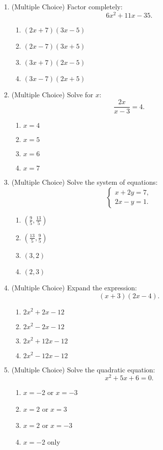 \documentclass[12pt]{article}
\begin{document}
\begin{enumerate}[label=\textbf{Question \arabic*:}]
  \item (Multiple Choice) Factor completely:
    \[
    6x^2 + 11x - 35.
    \]
    \begin{enumerate}[label=(\Alph*)]
      \item \((2x+7)(3x-5)\)
      \item \((2x-7)(3x+5)\)
      \item \((3x+7)(2x-5)\)
      \item \((3x-7)(2x+5)\)
    \end{enumerate}
    
  \item (Multiple Choice) Solve for \(x\):
    \[
    \frac{2x}{x-3} = 4.
    \]
    \begin{enumerate}[label=(\Alph*)]
      \item \(x = 4\)
      \item \(x = 5\)
      \item \(x = 6\)
      \item \(x = 7\)
    \end{enumerate}
    
  \item (Multiple Choice) Solve the system of equations:
    \[
    \begin{cases}
      x + 2y = 7, \\
      2x - y = 1.
    \end{cases}
    \]
    \begin{enumerate}[label=(\Alph*)]
      \item \(\left(\frac{9}{5}, \frac{13}{5}\right)\)
      \item \(\left(\frac{13}{5}, \frac{9}{5}\right)\)
      \item \((3,2)\)
      \item \((2,3)\)
    \end{enumerate}
    
  \item (Multiple Choice) Expand the expression:
    \[
    (x+3)(2x-4).
    \]
    \begin{enumerate}[label=(\Alph*)]
      \item \(2x^2+2x-12\)
      \item \(2x^2-2x-12\)
      \item \(2x^2+12x-12\)
      \item \(2x^2-12x-12\)
    \end{enumerate}
    
  \item (Multiple Choice) Solve the quadratic equation:
    \[
    x^2 + 5x + 6 = 0.
    \]
    \begin{enumerate}[label=(\Alph*)]
      \item \(x = -2\) or \(x = -3\)
      \item \(x = 2\) or \(x = 3\)
      \item \(x = 2\) or \(x = -3\)
      \item \(x = -2\) only
    \end{enumerate}
    

\end{enumerate}
\end{document}
